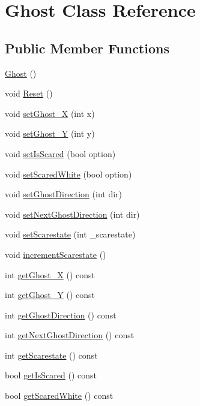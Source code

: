 \hypertarget{class_ghost}{}\section{Ghost Class Reference}
\label{class_ghost}
\subsection*{Public Member Functions}
\begin{DoxyCompactItemize}
\item 
\mbox{\hyperlink{class_ghost_a2e38d3c0c8546cceb74777b49a8e3bb7}{Ghost}} ()
\item 
void \mbox{\hyperlink{class_ghost_a51900002936b06acc029c845d9cb9240}{Reset}} ()
\item 
void \mbox{\hyperlink{class_ghost_a1f3b792655f805a40ebadd5651d0aa2a}{set\+Ghost\+\_\+X}} (int x)
\item 
void \mbox{\hyperlink{class_ghost_add5ef21063781debb4568305fd765162}{set\+Ghost\+\_\+Y}} (int y)
\item 
void \mbox{\hyperlink{class_ghost_a6e6f3e5ff87c2c9efeb58c188530f431}{set\+Is\+Scared}} (bool option)
\item 
void \mbox{\hyperlink{class_ghost_a22197187d8c42a2a2d2f0facdda54356}{set\+Scared\+White}} (bool option)
\item 
void \mbox{\hyperlink{class_ghost_a021a76713a5fdf501fd601d8644002bb}{set\+Ghost\+Direction}} (int dir)
\item 
void \mbox{\hyperlink{class_ghost_a3db876d86c02629c3a1aca84f63d4b70}{set\+Next\+Ghost\+Direction}} (int dir)
\item 
void \mbox{\hyperlink{class_ghost_ac57d9cbbba11f9c1b2bad35de42b417a}{set\+Scarestate}} (int \+\_\+scarestate)
\item 
void \mbox{\hyperlink{class_ghost_a0fa6a3ef0c3f9e33f6271fb5d2db2e24}{increment\+Scarestate}} ()
\item 
int \mbox{\hyperlink{class_ghost_aedf007ec72dec676c77734d29eedb2a8}{get\+Ghost\+\_\+X}} () const
\item 
int \mbox{\hyperlink{class_ghost_ae069b2ac96e5d13b5bd62cb1e75acf05}{get\+Ghost\+\_\+Y}} () const
\item 
int \mbox{\hyperlink{class_ghost_a3e8e504b59439d1fac4a72c2f55839c4}{get\+Ghost\+Direction}} () const
\item 
int \mbox{\hyperlink{class_ghost_a79c2a1a910758ead53489ab220c0bb3a}{get\+Next\+Ghost\+Direction}} () const
\item 
int \mbox{\hyperlink{class_ghost_a569122ead6a222f16e5603698b6b45e2}{get\+Scarestate}} () const
\item 
bool \mbox{\hyperlink{class_ghost_a36454848ec5fc01511d6d0a2ab81e21b}{get\+Is\+Scared}} () const
\item 
bool \mbox{\hyperlink{class_ghost_a052109c06bca7263f6bd0ccc963d5c48}{get\+Scared\+White}} () const
\end{DoxyCompactItemize}


